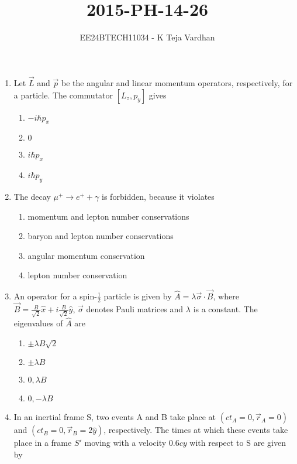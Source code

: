 \documentclass[journal]{IEEEtran}
\newcommand{\brak}[1]{\left( #1 \right)}
\newcommand{\sbrak}[1]{\left[ #1 \right]}
\begin{document}

\title{2015-PH-14-26}
\author{EE24BTECH11034 - K Teja Vardhan}
{\let\newpage\relax\maketitle}


\begin{enumerate}

\item Let $\vec{L}$ and $\vec{p}$ be the angular and linear momentum operators, respectively, for a particle. The commutator $\sbrak{L_z, p_y}$ gives

\begin{enumerate}
    \item $-i\hbar p_x$
    \item $0$
    \item $i\hbar p_x$
    \item $i\hbar p_y$
\end{enumerate}

\item The decay $\mu^+ \rightarrow e^+ + \gamma$ is forbidden, because it violates

\begin{enumerate}
    \item momentum and lepton number conservations
    \item baryon and lepton number conservations
    \item angular momentum conservation
    \item lepton number conservation
\end{enumerate}

\item An operator for a spin-$\frac{1}{2}$ particle is given by $\hat{A}=\lambda \vec{\sigma} \cdot \vec{B}$, where $\vec{B}=\frac{B}{\sqrt{2}}\hat{x}+i\frac{B}{\sqrt{2}}\hat{y}$, $\vec{\sigma}$ denotes Pauli matrices and $\lambda$ is a constant. The eigenvalues of $\hat{A}$ are

\begin{enumerate}
    \item $\pm \lambda B \sqrt{2}$
    \item $\pm \lambda B$
    \item $0, \lambda B$
    \item $0, -\lambda B$
\end{enumerate}

\item In an inertial frame S, two events A and B take place at $\brak{ct_A = 0, \vec{r}_A = 0}$ and $\brak{ct_B = 0, \vec{r}_B = 2\hat{y}}$, respectively. The times at which these events take place in a frame $S\prime$ moving with a velocity $0.6cy$ with respect to S are given by


\end{enumerate}
\end{document}
